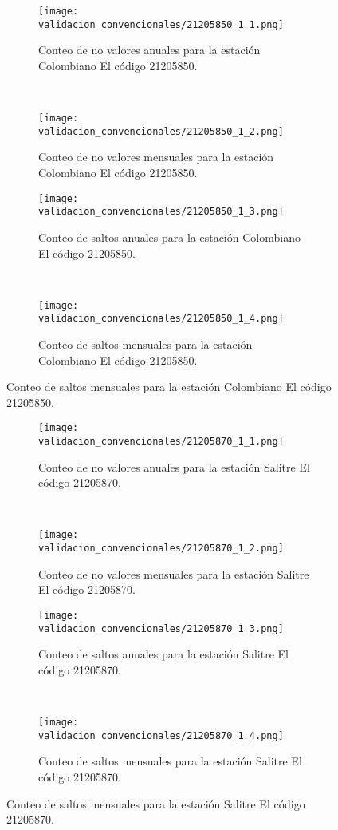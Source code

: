 \begin{figure}[H]\ContinuedFloat
\centering
	\begin{subfigure}[normla]{0.4\textwidth}
	\texttt{[image: validacion\_convencionales/21205850\_1\_1.png]}
		\caption{Conteo de no valores anuales para la estación Colombiano El código 21205850.}
		\label{subfig:a1}
		\end{subfigure}
		~
    \begin{subfigure}[normla]{0.4\textwidth}
	\texttt{[image: validacion\_convencionales/21205850\_1\_2.png]}
		\caption{Conteo de no valores mensuales para la estación Colombiano El código 21205850.}
		\label{subfig:a2}
		\end{subfigure}
		
    \begin{subfigure}[normla]{0.4\textwidth}
	\texttt{[image: validacion\_convencionales/21205850\_1\_3.png]}
		\caption{Conteo de saltos anuales para la estación Colombiano El código 21205850.}
		\label{subfig:a1}
		\end{subfigure}
		~
    \begin{subfigure}[normla]{0.4\textwidth}
	\texttt{[image: validacion\_convencionales/21205850\_1\_4.png]}
		\caption{Conteo de saltos mensuales para la estación Colombiano El código 21205850.}
		\label{subfig:a2}
		\end{subfigure}

	
\end{figure}
           
\begin{figure}[H]\ContinuedFloat
\centering
	\begin{subfigure}[normla]{0.4\textwidth}
	\texttt{[image: validacion\_convencionales/21205870\_1\_1.png]}
		\caption{Conteo de no valores anuales para la estación Salitre El código 21205870.}
		\label{subfig:a1}
		\end{subfigure}
		~
    \begin{subfigure}[normla]{0.4\textwidth}
	\texttt{[image: validacion\_convencionales/21205870\_1\_2.png]}
		\caption{Conteo de no valores mensuales para la estación Salitre El código 21205870.}
		\label{subfig:a2}
		\end{subfigure}
		
    \begin{subfigure}[normla]{0.4\textwidth}
	\texttt{[image: validacion\_convencionales/21205870\_1\_3.png]}
		\caption{Conteo de saltos anuales para la estación Salitre El código 21205870.}
		\label{subfig:a1}
		\end{subfigure}
		~
    \begin{subfigure}[normla]{0.4\textwidth}
	\texttt{[image: validacion\_convencionales/21205870\_1\_4.png]}
		\caption{Conteo de saltos mensuales para la estación Salitre El código 21205870.}
		\label{subfig:a2}
		\end{subfigure}

	
\end{figure}
           
